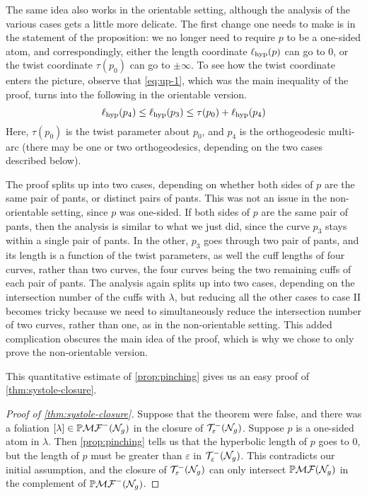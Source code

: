 \documentclass[12pt, reqno]{amsart}
\begin{document}
\begin{remark}
  The same idea also works in the orientable setting, although the analysis of the various cases gets a little more delicate.
  The first change one needs to make is in the statement of the proposition: we no longer need to require $p$ to be a one-sided atom, and correspondingly, either the length coordinate $\ell_{\mathrm{hyp}}(p)$ can go to $0$, or the twist coordinate $\tau(p_0)$ can go to $\pm \infty$.
  To see how the twist coordinate enters the picture, observe that \eqref{eq:up-1}, which was the main inequality of the proof, turns into the following in the orientable version.
  \begin{equation}
    \label{eq:up-11}
    \ell_{\mathrm{hyp}}(p_4)  \leq \ell_{\mathrm{hyp}}(p_3) \leq \tau(p_0) + \ell_{\mathrm{hyp}}(p_4)
  \end{equation}
  Here, $\tau(p_0)$ is the twist parameter about $p_0$, and $p_4$ is the orthogeodesic multi-arc (there may be one or two orthogeodesics, depending on the two cases described below).

  The proof splits up into two cases, depending on whether both sides of $p$ are the same pair of pants, or distinct pairs of pants.
  This was not an issue in the non-orientable setting, since $p$ was one-sided.
  If both sides of $p$ are the same pair of pants, then the analysis is similar to what we just did, since the curve $p_3$ stays within a single pair of pants.
  In the other, $p_3$ goes through two pair of pants, and its length is a function of the twist parameters, as well the cuff lengths of four curves, rather than two curves, the four curves being the two remaining cuffs of each pair of pants.
  The analysis again splits up into two cases, depending on the intersection number of the cuffs with $\lambda$, but reducing all the other cases to case II becomes tricky because we need to simultaneously reduce the intersection number of two curves, rather than one, as in the non-orientable setting.
  This added complication obscures the main idea of the proof, which is why we chose to only prove the non-orientable version.
\end{remark}

This quantitative estimate of \autoref{prop:pinching} gives us an easy proof of \autoref{thm:systole-closure}.
\begin{proof}[Proof of \autoref{thm:systole-closure}]
  Suppose that the theorem were false, and there was a foliation $[\lambda] \in \mathbb{P}\mathcal{MF}^-(\mathcal{N}_g)$ in the closure of $\mathcal{T}_{\varepsilon}^{-}(\mathcal{N}_g)$.
  Suppose $p$ is a one-sided atom in $\lambda$.
  Then \autoref{prop:pinching} tells us that the hyperbolic length of $p$ goes to $0$, but the length of $p$ must be greater than $\varepsilon$ in $\mathcal{T}_{\varepsilon}^{-}(\mathcal{N}_g)$.
  This contradicts our initial assumption, and the closure of $\mathcal{T}_{\varepsilon}^{-}(\mathcal{N}_g)$ can only intersect $\mathbb{P}\mathcal{MF}(\mathcal{N}_g)$ in the complement of $\mathbb{P}\mathcal{MF}^-(\mathcal{N}_g)$.
\end{proof}
\end{document}
